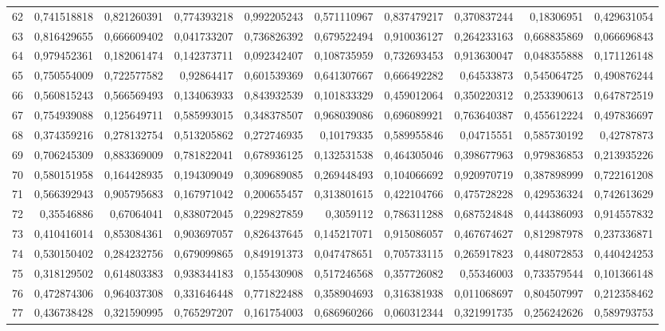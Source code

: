 \documentclass{article}
\begin{document}
\begin{landscape}
\begin{longtable}{lrrrrrrrrr}
62	&	0,741518818	&	0,821260391	&	0,774393218	&	0,992205243	&	0,571110967	&	0,837479217	&	0,370837244	&	0,18306951	&	0,429631054	\\
63	&	0,816429655	&	0,666609402	&	0,041733207	&	0,736826392	&	0,679522494	&	0,910036127	&	0,264233163	&	0,668835869	&	0,066696843	\\
64	&	0,979452361	&	0,182061474	&	0,142373711	&	0,092342407	&	0,108735959	&	0,732693453	&	0,913630047	&	0,048355888	&	0,171126148	\\
65	&	0,750554009	&	0,722577582	&	0,92864417	&	0,601539369	&	0,641307667	&	0,666492282	&	0,64533873	&	0,545064725	&	0,490876244	\\
66	&	0,560815243	&	0,566569493	&	0,134063933	&	0,843932539	&	0,101833329	&	0,459012064	&	0,350220312	&	0,253390613	&	0,647872519	\\
67	&	0,754939088	&	0,125649711	&	0,585993015	&	0,348378507	&	0,968039086	&	0,696089921	&	0,763640387	&	0,455612224	&	0,497836697	\\
68	&	0,374359216	&	0,278132754	&	0,513205862	&	0,272746935	&	0,10179335	&	0,589955846	&	0,04715551	&	0,585730192	&	0,42787873	\\
69	&	0,706245309	&	0,883369009	&	0,781822041	&	0,678936125	&	0,132531538	&	0,464305046	&	0,398677963	&	0,979836853	&	0,213935226	\\
70	&	0,580151958	&	0,164428935	&	0,194309049	&	0,309689085	&	0,269448493	&	0,104066692	&	0,920970719	&	0,387898999	&	0,722161208	\\
71	&	0,566392943	&	0,905795683	&	0,167971042	&	0,200655457	&	0,313801615	&	0,422104766	&	0,475728228	&	0,429536324	&	0,742613629	\\
72	&	0,35546886	&	0,67064041	&	0,838072045	&	0,229827859	&	0,3059112	&	0,786311288	&	0,687524848	&	0,444386093	&	0,914557832	\\
73	&	0,410416014	&	0,853084361	&	0,903697057	&	0,826437645	&	0,145217071	&	0,915086057	&	0,467674627	&	0,812987978	&	0,237336871	\\
74	&	0,530150402	&	0,284232756	&	0,679099865	&	0,849191373	&	0,047478651	&	0,705733115	&	0,265917823	&	0,448072853	&	0,440424253	\\
75	&	0,318129502	&	0,614803383	&	0,938344183	&	0,155430908	&	0,517246568	&	0,357726082	&	0,55346003	&	0,733579544	&	0,101366148	\\
76	&	0,472874306	&	0,964037308	&	0,331646448	&	0,771822488	&	0,358904693	&	0,316381938	&	0,011068697	&	0,804507997	&	0,212358462	\\
77	&	0,436738428	&	0,321590995	&	0,765297207	&	0,161754003	&	0,686960266	&	0,060312344	&	0,321991735	&	0,256242626	&	0,589793753	\\

\end{longtable}
\end{landscape}
\end{document}
